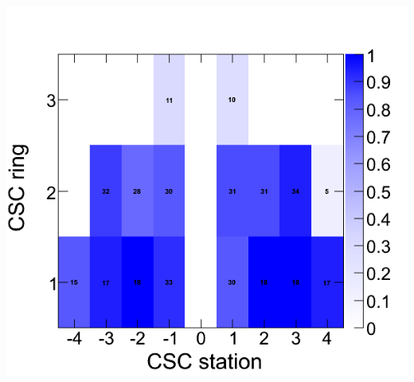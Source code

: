 \documentclass[compress]{beamer}
\begin{document}
\begin{frame}
\begin{columns}
\includegraphics[width=\linewidth]{il20_CSC_fraction.png}

\end{columns}

\end{frame}

\end{document}
